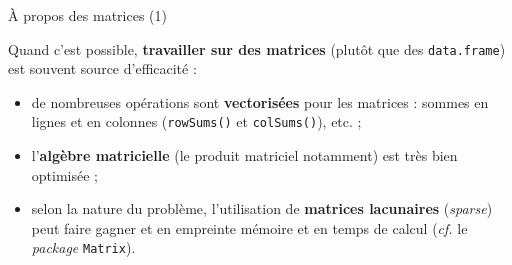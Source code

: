 \documentclass[12pt,ignorenonframetext,handout,]{beamer}
\providecommand{\tightlist}{%
  \setlength{\itemsep}{0pt}\setlength{\parskip}{0pt}}
\begin{document}
\begin{frame}[fragile]{À propos des matrices (1)}
\protect\hypertarget{a-propos-des-matrices-1}{}

Quand c’est possible, \textbf{travailler sur des matrices} (plutôt que
des \texttt{data.frame}) est souvent source d’efficacité :

\vfill

\begin{itemize}
\tightlist
\item
  \pause de nombreuses opérations sont \textbf{vectorisées} pour les
  matrices : sommes en lignes et en colonnes (\texttt{rowSums()} et
  \texttt{colSums()}), etc. ;
\end{itemize}

\vfill

\begin{itemize}
\tightlist
\item
  \pause l’\textbf{algèbre matricielle} (le produit matriciel notamment)
  est très bien optimisée ;
\end{itemize}

\vfill

\begin{itemize}
\tightlist
\item
  \pause selon la nature du problème, l’utilisation de \textbf{matrices
  lacunaires} (\emph{sparse}) peut faire gagner et en empreinte mémoire
  et en temps de calcul (\emph{cf.} le \emph{package} \texttt{Matrix}).
\end{itemize}

\end{frame}
\end{document}

